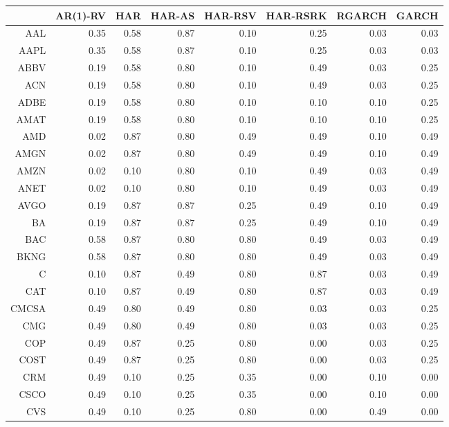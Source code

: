 \begin{table}[ht]
\centering
\begin{tabular}{rrrrrrrr}
  \hline
 & AR(1)-RV & HAR & HAR-AS & HAR-RSV & HAR-RSRK & RGARCH & GARCH \\ 
  \hline
AAL & 0.35 & 0.58 & 0.87 & 0.10 & 0.25 & 0.03 & 0.03 \\ 
  AAPL & 0.35 & 0.58 & 0.87 & 0.10 & 0.25 & 0.03 & 0.03 \\ 
  ABBV & 0.19 & 0.58 & 0.80 & 0.10 & 0.49 & 0.03 & 0.25 \\ 
  ACN & 0.19 & 0.58 & 0.80 & 0.10 & 0.49 & 0.03 & 0.25 \\ 
  ADBE & 0.19 & 0.58 & 0.80 & 0.10 & 0.10 & 0.10 & 0.25 \\ 
  AMAT & 0.19 & 0.58 & 0.80 & 0.10 & 0.10 & 0.10 & 0.25 \\ 
  AMD & 0.02 & 0.87 & 0.80 & 0.49 & 0.49 & 0.10 & 0.49 \\ 
  AMGN & 0.02 & 0.87 & 0.80 & 0.49 & 0.49 & 0.10 & 0.49 \\ 
  AMZN & 0.02 & 0.10 & 0.80 & 0.10 & 0.49 & 0.03 & 0.49 \\ 
  ANET & 0.02 & 0.10 & 0.80 & 0.10 & 0.49 & 0.03 & 0.49 \\ 
  AVGO & 0.19 & 0.87 & 0.87 & 0.25 & 0.49 & 0.10 & 0.49 \\ 
  BA & 0.19 & 0.87 & 0.87 & 0.25 & 0.49 & 0.10 & 0.49 \\ 
  BAC & 0.58 & 0.87 & 0.80 & 0.80 & 0.49 & 0.03 & 0.49 \\ 
  BKNG & 0.58 & 0.87 & 0.80 & 0.80 & 0.49 & 0.03 & 0.49 \\ 
  C & 0.10 & 0.87 & 0.49 & 0.80 & 0.87 & 0.03 & 0.49 \\ 
  CAT & 0.10 & 0.87 & 0.49 & 0.80 & 0.87 & 0.03 & 0.49 \\ 
  CMCSA & 0.49 & 0.80 & 0.49 & 0.80 & 0.03 & 0.03 & 0.25 \\ 
  CMG & 0.49 & 0.80 & 0.49 & 0.80 & 0.03 & 0.03 & 0.25 \\ 
  COP & 0.49 & 0.87 & 0.25 & 0.80 & 0.00 & 0.03 & 0.25 \\ 
  COST & 0.49 & 0.87 & 0.25 & 0.80 & 0.00 & 0.03 & 0.25 \\ 
  CRM & 0.49 & 0.10 & 0.25 & 0.35 & 0.00 & 0.10 & 0.00 \\ 
  CSCO & 0.49 & 0.10 & 0.25 & 0.35 & 0.00 & 0.10 & 0.00 \\ 
  CVS & 0.49 & 0.10 & 0.25 & 0.80 & 0.00 & 0.49 & 0.00 \\ 

\end{tabular}
\end{table}
